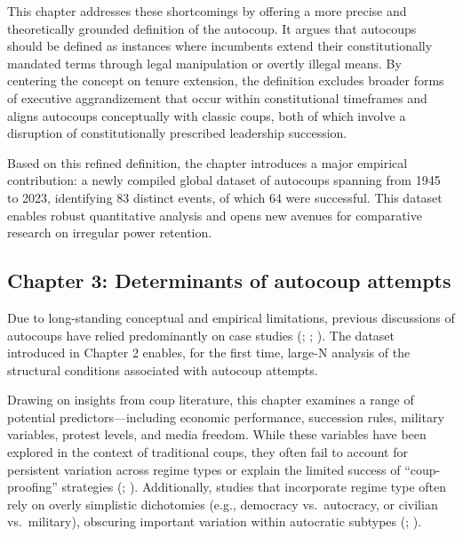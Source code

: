 \documentclass[
  12pt,
]{report}
\begin{document}
This chapter addresses these shortcomings by offering a more precise and
theoretically grounded definition of the autocoup. It argues that
autocoups should be defined as instances where incumbents extend their
constitutionally mandated terms through legal manipulation or overtly
illegal means. By centering the concept on tenure extension, the
definition excludes broader forms of executive aggrandizement that occur
within constitutional timeframes and aligns autocoups conceptually with
classic coups, both of which involve a disruption of constitutionally
prescribed leadership succession.

Based on this refined definition, the chapter introduces a major
empirical contribution: a newly compiled global dataset of autocoups
spanning from 1945 to 2023, identifying 83 distinct events, of which 64
were successful. This dataset enables robust quantitative analysis and
opens new avenues for comparative research on irregular power retention.

\subsection*{Chapter 3: Determinants of autocoup
attempts}\label{chapter-3-determinants-of-autocoup-attempts}

Due to long-standing conceptual and empirical limitations, previous
discussions of autocoups have relied predominantly on case studies
(;
;
). The dataset
introduced in Chapter 2 enables, for the first time, large-N analysis of
the structural conditions associated with autocoup attempts.

Drawing on insights from coup literature, this chapter examines a range
of potential predictors---including economic performance, succession
rules, military variables, protest levels, and media freedom. While
these variables have been explored in the context of traditional coups,
they often fail to account for persistent variation across regime types
or explain the limited success of ``coup-proofing'' strategies
(;
). Additionally, studies that
incorporate regime type often rely on overly simplistic dichotomies
(e.g., democracy vs.~autocracy, or civilian vs.~military), obscuring
important variation within autocratic subtypes
(;
).
\end{document}
